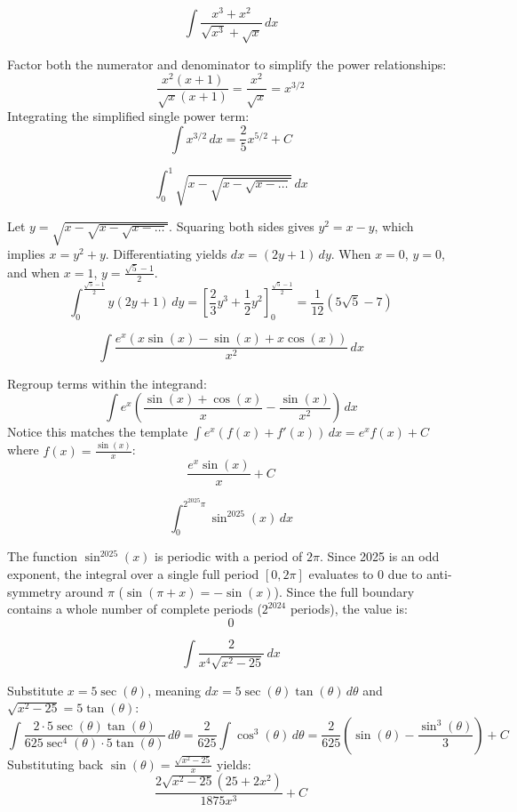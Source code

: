 \begin{questions}
\question
\[ \int \frac{x^{3}+x^{2}}{\sqrt{x^{3}}+\sqrt{x}} \, dx \]
\begin{solution}
Factor both the numerator and denominator to simplify the power relationships:
\[ \frac{x^2(x+1)}{\sqrt{x}(x+1)} = \frac{x^2}{\sqrt{x}} = x^{3/2} \]
Integrating the simplified single power term:
\[ \int x^{3/2} \, dx = \frac{2}{5}x^{5/2} + C \]
\end{solution}

\question
\[ \int_{0}^{1} \sqrt{x-\sqrt{x-\sqrt{x-\dots}}} \, dx \]
\begin{solution}
Let $y = \sqrt{x-\sqrt{x-\sqrt{x-\dots}}}$. Squaring both sides gives $y^2 = x - y$, which implies $x = y^2 + y$. Differentiating yields $dx = (2y+1) \, dy$. When $x=0$, $y=0$, and when $x=1$, $y = \frac{\sqrt{5}-1}{2}$.
\[ \int_{0}^{\frac{\sqrt{5}-1}{2}} y(2y+1) \, dy = \left[ \frac{2}{3}y^3 + \frac{1}{2}y^2 \right]_{0}^{\frac{\sqrt{5}-1}{2}} = \frac{1}{12}(5\sqrt{5}-7) \]
\end{solution}

\question
\[ \int \frac{e^{x}(x\sin(x)-\sin(x)+x\cos(x))}{x^{2}} \, dx \]
\begin{solution}
Regroup terms within the integrand:
\[ \int e^x \left( \frac{\sin(x)+\cos(x)}{x} - \frac{\sin(x)}{x^2} \right) \, dx \]
Notice this matches the template $\int e^x (f(x)+f'(x)) \, dx = e^x f(x) + C$ where $f(x) = \frac{\sin(x)}{x}$:
\[ \frac{e^{x}\sin(x)}{x} + C \]
\end{solution}

\question
\[ \int_{0}^{2^{2025}\pi} \sin^{2025}(x) \, dx \]
\begin{solution}
The function $\sin^{2025}(x)$ is periodic with a period of $2\pi$. Since 2025 is an odd exponent, the integral over a single full period $[0, 2\pi]$ evaluates to $0$ due to anti-symmetry around $\pi$ ($\sin(\pi+x) = -\sin(x)$). Since the full boundary contains a whole number of complete periods ($2^{2024}$ periods), the value is:
\[ 0 \]
\end{solution}

\question
\[ \int \frac{2}{x^{4}\sqrt{x^{2}-25}} \, dx \]
\begin{solution}
Substitute $x = 5\sec(\theta)$, meaning $dx = 5\sec(\theta)\tan(\theta) \, d\theta$ and $\sqrt{x^2-25} = 5\tan(\theta)$:
\[ \int \frac{2 \cdot 5\sec(\theta)\tan(\theta)}{625\sec^4(\theta) \cdot 5\tan(\theta)} \, d\theta = \frac{2}{625}\int \cos^3(\theta) \, d\theta = \frac{2}{625}\left(\sin(\theta) - \frac{\sin^3(\theta)}{3}\right) + C \]
Substituting back $\sin(\theta) = \frac{\sqrt{x^2-25}}{x}$ yields:
\[ \frac{2\sqrt{x^{2}-25}(25+2x^{2})}{1875x^{3}} + C \]
\end{solution}


\end{questions}
